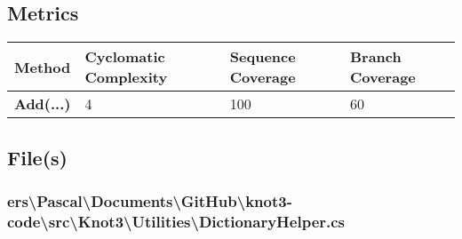 \documentclass[a4paper,10pt]{article}
\begin{document}
\subsection{Metrics}
\begin{longtable}[l]{|l|l|l|l|}
\hline
\textbf{Method} & \textbf{Cyclomatic Complexity} & \textbf{Sequence Coverage} & \textbf{Branch Coverage}\\
\hline
\textbf{Add(...)} & 4 & 100 & 60\\
\hline
\end{longtable}
\subsection{File(s)}
\subsubsection{ers\textbackslash Pascal\textbackslash Documents\textbackslash GitHub\textbackslash knot3-code\textbackslash src\textbackslash Knot3\textbackslash Utilities\textbackslash DictionaryHelper.cs}
\end{document}
